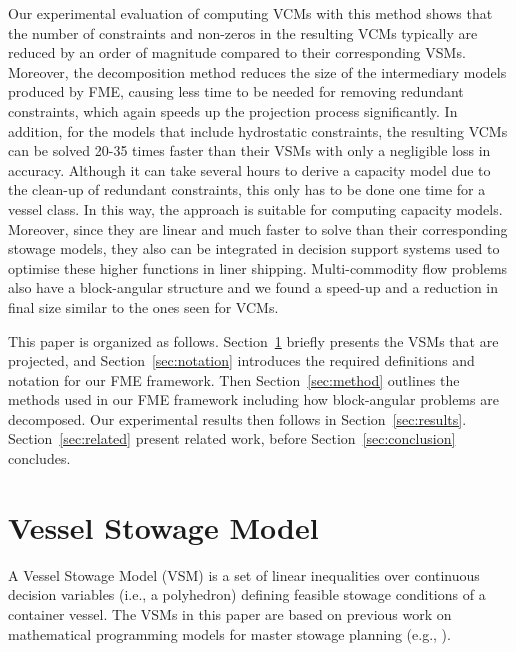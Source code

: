 \documentclass{llncs}
\begin{document}
Our experimental evaluation of computing VCMs with this method shows that the number of constraints and non-zeros in the resulting VCMs typically are reduced by an order of magnitude compared to their corresponding VSMs. Moreover, the decomposition method reduces the size of the intermediary models produced by FME, causing less time to be needed for removing redundant constraints, which again speeds up the projection process significantly. In addition, for the models that include hydrostatic constraints, the resulting VCMs can be solved 20-35 times faster than their VSMs with only a negligible loss in accuracy. Although it can take several hours to derive a capacity model due to the clean-up of redundant constraints, this only has to be done one time for a vessel class. In this way, the approach is suitable for computing capacity models. Moreover, since they are linear and much faster to solve than their corresponding stowage models, they also can be integrated in decision support systems used to optimise these higher functions in liner shipping. Multi-commodity flow problems also have a block-angular structure and we found a speed-up and a reduction in final size similar to the ones seen for VCMs.

This paper is organized as follows. Section~\ref{sec:model} briefly presents the VSMs that are projected, and Section~\ref{sec:notation} introduces the required definitions and notation for our FME framework. Then Section~\ref{sec:method} outlines the methods used in our FME framework including how block-angular problems are decomposed. Our experimental results then follows in Section~\ref{sec:results}. Section~\ref{sec:related} present related work, before Section~\ref{sec:conclusion} concludes.


\section{Vessel Stowage Model}\label{sec:model}
A Vessel Stowage Model (VSM) is a set of linear inequalities over continuous decision variables (i.e., a polyhedron) defining feasible stowage conditions of a container vessel. The VSMs in this paper are based on previous work on mathematical programming models for master stowage planning (e.g., \cite{pacino11,pacino12}). 
\end{document}
